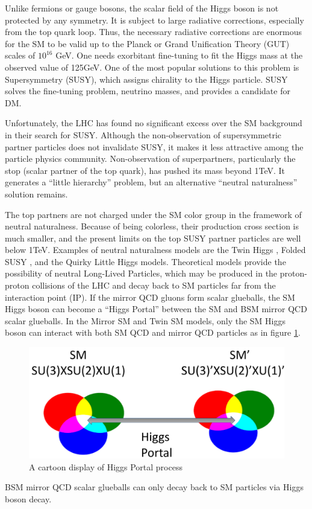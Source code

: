 Unlike fermions or gauge bosons, the scalar field of the Higgs boson is not protected by any symmetry. It is subject to large radiative corrections, especially from the top quark loop.
Thus, the necessary radiative corrections are enormous for the SM to be valid up to the Planck or Grand Unification Theory (GUT) scales of $10^{16}$ GeV.
One needs exorbitant fine-tuning to fit the Higgs mass at the observed value of 125GeV.
One of the most popular solutions to this problem is Supersymmetry (SUSY), which assigns chirality to the Higgs particle.
SUSY solves the fine-tuning problem, neutrino masses, and provides a candidate for DM.

Unfortunately, the LHC has found no significant excess over the SM background in their search for SUSY\cite{SUSY}.
Although the non-observation of supersymmetric partner particles does not invalidate SUSY, it makes it less attractive among the particle physics community.
Non-observation of superpartners, particularly the stop (scalar partner of the top quark), has pushed its mass beyond 1TeV.
It generates a ``little hierarchy'' problem, but an alternative ``neutral naturalness'' solution remains.

The top partners are not charged under the SM color group in the framework of neutral naturalness.
Because of being colorless, their production cross section is much smaller, and the present limits on the top SUSY partner particles are well below 1TeV.
Examples of neutral naturalness models are the Twin Higgs \cite{Chacko:2005pe},
Folded SUSY \cite{Burdman:2006tz}, and the Quirky Little Higgs \cite{Cai:2008au} models.
Theoretical models provide the possibility of neutral Long-Lived Particles, which may be produced in the proton-proton
collisions of the LHC and decay back to SM particles far from the interaction point (IP).\cite{Craig:2015pha}
If the mirror QCD gluons form scalar glueballs, the SM Higgs boson can become a ``Higgs Portal'' between the SM and BSM mirror QCD scalar glueballs.
In the Mirror SM and Twin SM models, only the SM Higgs boson can interact with both SM QCD and mirror QCD particles as in figure \ref{fig:2HiggsPortal}.
\begin{figure}[h!]
  \caption{A cartoon display of Higgs Portal process}
  \label{fig:2HiggsPortal}
  \centering
  \includegraphics[width=0.87\linewidth]{figs/Portalcartoon.png}
\end{figure}
BSM mirror QCD scalar glueballs can only decay back to SM particles via Higgs boson decay.

